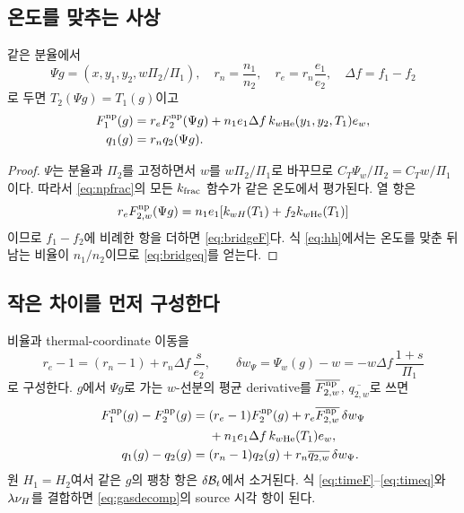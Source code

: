 \subsection{온도를 맞추는 사상}
\begin{theorem}\label{thm:bridge}
같은 분율에서
\begin{equation}
\Psi g=(x,y_1,y_2,w\Pi_2/\Pi_1),\quad
r_n=\frac{n_1}{n_2},\quad
r_e=r_n\frac{e_1}{e_2},\quad \Delta f=f_1-f_2
\label{eq:psi}
\end{equation}
로 두면 $T_2(\Psi g)=T_1(g)$이고
\begin{align}
F^{\rm np}_1(g)
&=r_e F^{\rm np}_2(\Psi g)
+n_1e_1\Delta f\,k_{w{\rm He}}(y_1,y_2,T_1)e_w,\label{eq:bridgeF}\\
q_1(g)&=r_nq_2(\Psi g).
\label{eq:bridgeq}
\end{align}
\end{theorem}
\begin{proof}
$\Psi$는 분율과 $\Pi_2$를 고정하면서 $w$를 $w\Pi_2/\Pi_1$로 바꾸므로
$C_T\Psi_w/\Pi_2=C_Tw/\Pi_1$이다.
따라서 \eqref{eq:npfrac}의 모든 $k_{\rm frac}$ 함수가 같은 온도에서 평가된다.
열 항은
\[
r_e F^{\rm np}_{2,w}(\Psi g)
=n_1e_1[k_{wH}(T_1)+f_2k_{w{\rm He}}(T_1)]
\]
이므로 $f_1-f_2$에 비례한 항을 더하면 \eqref{eq:bridgeF}다.
식 \eqref{eq:hh}에서는 온도를 맞춘 뒤 남는 비율이 $n_1/n_2$이므로
\eqref{eq:bridgeq}를 얻는다.
\end{proof}

\subsection{작은 차이를 먼저 구성한다}
비율과 thermal-coordinate 이동을
\begin{equation}
r_e-1=(r_n-1)+r_n\Delta f\,\frac{s}{e_2},\qquad
\delta w_\Psi=\Psi_w(g)-w=-w\Delta f\,\frac{1+s}{\Pi_1}
\label{eq:small_bridge}
\end{equation}
로 구성한다. $g$에서 $\Psi g$로 가는 $w$-선분의 평균 derivative를
$\overline{F^{\rm np}_{2,w}}$, $\overline{q_{2,w}}$로 쓰면
\begin{align}
F^{\rm np}_1(g)-F^{\rm np}_2(g)
={}&(r_e-1)F^{\rm np}_2(g)
+r_e\overline{F^{\rm np}_{2,w}}\,\delta w_\Psi\nonumber\\
&+n_1e_1\Delta f\,k_{w{\rm He}}(T_1)e_w,\label{eq:timeF}\\
q_1(g)-q_2(g)
={}&(r_n-1)q_2(g)
+r_n\overline{q_{2,w}}\,\delta w_\Psi .
\label{eq:timeq}
\end{align}
원 $H_1=H_2$여서 같은 $g$의 팽창 항은 $\delta\mathcal B_t$에서 소거된다.
식 \eqref{eq:timeF}--\eqref{eq:timeq}와 $\lambda\nu_H$를 결합하면
\eqref{eq:gasdecomp}의 source 시각 항이 된다.

